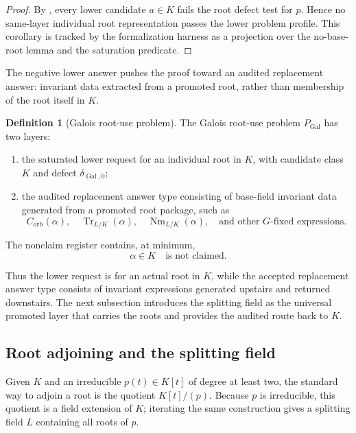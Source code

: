 \documentclass[11pt]{article}
\newcommand{\Gal}{\operatorname{Gal}}
\newcommand{\Tr}{\operatorname{Tr}}
\newcommand{\Nm}{\operatorname{Nm}}
\theoremstyle{definition}
\newtheorem{definition}[theorem]{Definition}
\begin{document}
\begin{proof}
By , every lower candidate \(a\in K\) fails the root
defect test for \(p\).  Hence no same-layer individual root representation passes
the lower problem profile.  This corollary is tracked by the formalization
harness as a projection over the no-base-root lemma and the saturation
predicate.
\end{proof}

The negative lower answer pushes the proof toward an audited replacement answer:
invariant data extracted from a promoted root, rather than membership of the root
itself in \(K\).

\begin{definition}[Galois root-use problem]
\label{def:gal-root-use-problem}
The Galois root-use problem \(P_{\Gal}\) has two layers:
\begin{enumerate}
\item the saturated lower request for an individual root in \(K\), with candidate class \(K\) and defect \(\delta_{\Gal,0}\);
\item the audited replacement answer type consisting of base-field invariant data generated from a promoted root package, such as
\[
C_{\mathrm{orb}}(\alpha),
\quad
\Tr_{L/K}(\alpha),
\quad
\Nm_{L/K}(\alpha),
\quad
\text{and other }G\text{-fixed expressions}.
\]
\end{enumerate}
The nonclaim register contains, at minimum,
\[
\alpha\in K
\quad\text{is not claimed.}
\]
\end{definition}

Thus the lower request is for an actual root in \(K\), while the accepted
replacement answer type consists of invariant expressions generated upstairs and
returned downstairs.  The next subsection introduces the splitting field as the
universal promoted layer that carries the roots and provides the audited route
back to \(K\).

\subsection{Root adjoining and the splitting field}
\label{subsec:gal-root-adjoining}

Given \(K\) and an irreducible \(p(t)\in K[t]\) of degree at least two, the
standard way to adjoin a root is the quotient \(K[t]/(p)\).  Because \(p\) is
irreducible, this quotient is a field extension of \(K\); iterating the same
construction gives a splitting field \(L\) containing all roots of \(p\).
\end{document}
